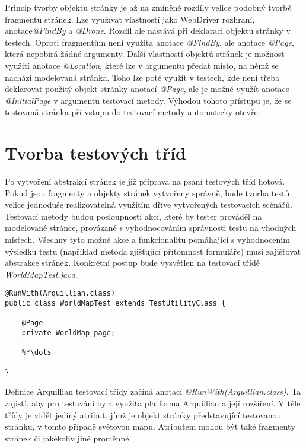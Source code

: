 \documentclass[
    color,   %
	table,   %
    twoside, %
    nolot, nolof
]{fithesis3}
\begin{document}
Princip tvorby objektu stránky je až na zmíněné rozdíly velice podobný tvorbě fragmentů stránek. Lze využívat vlastností jako WebDriver rozhraní, anotace\emph{@FindBy} a \emph{@Drone}. Rozdíl ale nastává při deklaraci objektu stránky v testech. Oproti fragmentům není využita anotace \emph{@FindBy}, ale anotace \emph{@Page}, která nepobírá žádné argumenty. Další vlastností objektů stránek je možnost využití anotace \emph{@Location}, které lze v argumentu předat místo, na němž se nachází modelovaná stránka. Toho lze poté využít v testech, kde není třeba deklarovat použitý objekt stránky anotací \emph{@Page}, ale je možné využít anotace \emph{@InitialPage} v argumentu testovací metody. Výhodou tohoto přístupu je, že se testovaná stránka při vstupu do testovací metody automaticky otevře.

\section{Tvorba testových tříd}
Po vytvoření abstrakcí stránek je již příprava na psaní testových tříd hotová. Pokud jsou fragmenty a objekty stránek vytvořeny správně, bude tvorba testů velice jednoduše realizovatelná využitím dříve vytvořených testovacích scénářů. Testovací metody budou posloupností akcí, které by tester prováděl na modelované stránce, provázané s vyhodnocováním správnosti testu na vhodných místech. Všechny tyto možné akce a funkcionalitu pomáhající s vyhodnocením výsledku testu (například metoda zjišťující přítomnost formuláře) musí zajišťovat abstrakce stránek. Konkrétní postup bude vysvětlen na testovací třídě \emph{WorldMapTest.java}.

\begin{lstlisting}
@RunWith(Arquillian.class)
public class WorldMapTest extends TestUtilityClass {

	@Page
	private WorldMap page;
 	
 	%*\dots
 	
}
\end{lstlisting} 

Definice Arquillian testovací třídy začíná anotací \emph{@RunWith(Arquillian.class)}. Ta zajistí, aby pro testování byla využita platforma Arquillian a její rozšíření. V těle třídy je vidět jediný atribut, jímž je objekt stránky představující testovanou stránku, v tomto případě světovou mapu. Atributem mohou být také fragmenty stránek či jakékoliv jiné proměnné.
\end{document}
